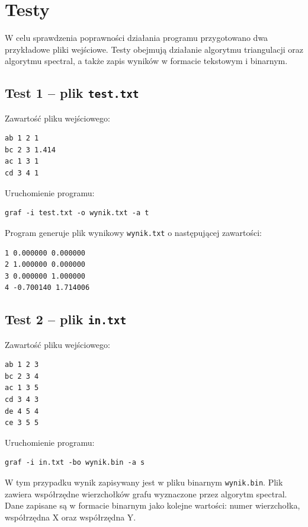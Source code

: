 \documentclass[11pt,a4paper]{article}
\begin{document}
\section{Testy}

W celu sprawdzenia poprawności działania programu przygotowano dwa
przykładowe pliki wejściowe. Testy obejmują działanie algorytmu
triangulacji oraz algorytmu spectral, a także zapis wyników
w formacie tekstowym i binarnym.

\subsection{Test 1 -- plik \texttt{test.txt}}

Zawartość pliku wejściowego:

\begin{verbatim}
ab 1 2 1
bc 2 3 1.414
ac 1 3 1
cd 3 4 1
\end{verbatim}

Uruchomienie programu:

\begin{verbatim}
graf -i test.txt -o wynik.txt -a t
\end{verbatim}

Program generuje plik wynikowy \verb|wynik.txt| o następującej zawartości:

\begin{verbatim}
1 0.000000 0.000000
2 1.000000 0.000000
3 0.000000 1.000000
4 -0.700140 1.714006
\end{verbatim}

\subsection{Test 2 -- plik \texttt{in.txt}}

Zawartość pliku wejściowego:

\begin{verbatim}
ab 1 2 3
bc 2 3 4
ac 1 3 5
cd 3 4 3
de 4 5 4
ce 3 5 5
\end{verbatim}

Uruchomienie programu:

\begin{verbatim}
graf -i in.txt -bo wynik.bin -a s
\end{verbatim}

W tym przypadku wynik zapisywany jest w pliku binarnym \verb|wynik.bin|.
Plik zawiera współrzędne wierzchołków grafu wyznaczone przez algorytm
spectral. Dane zapisane są w formacie binarnym jako kolejne wartości:
numer wierzchołka, współrzędna X oraz współrzędna Y.
\end{document}
